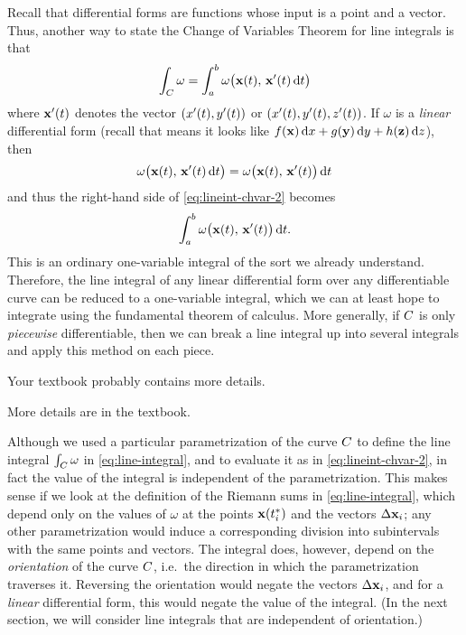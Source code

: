 \documentclass[12pt]{amsart}
\begin{document}
Recall that differential forms are functions whose input is a point and a vector.
Thus, another way to state the Change of Variables Theorem for line integrals is that
\begin{equation}
  \int_{C} \omega = \int_a^b \omega\big(\mathbf{x}(t),\, \mathbf{x}'(t) \,{\mathrm{d} t}\big)\label{eq:lineint-chvar-2}
\end{equation}
where $\mathbf{x}'(t)$ denotes the vector $(x'(t),y'(t))$ or $(x'(t),y'(t),z'(t))$.
If $\omega$ is a \emph{linear} differential form (recall that means it looks like $f(\mathbf{x})\,{\mathrm{d} x} + g(\mathbf{y})\,{\mathrm{d} y} + h(\mathbf{z})\,{\mathrm{d} z}$), then
\[ \omega\big(\mathbf{x}(t),\, \mathbf{x}'(t) \,{\mathrm{d} t}\big) = \omega\big(\mathbf{x}(t),\, \mathbf{x}'(t)\big)\,{\mathrm{d} t} \]
and thus the right-hand side of \cref{eq:lineint-chvar-2} becomes
\[ \int_a^b \omega\big(\mathbf{x}(t),\, \mathbf{x}'(t)\big)\,{\mathrm{d} t}. \]
This is an ordinary one-variable integral of the sort we already understand.
Therefore, the line integral of any linear differential form over any differentiable curve can be reduced to a one-variable integral, which we can at least hope to integrate using the fundamental theorem of calculus.
More generally, if $C$ is only \emph{piecewise} differentiable, then we can break a line integral up into several integrals and apply this method on each piece.
\begin{notextbook}Your textbook probably contains more details.\end{notextbook}
\begin{stewart}More details are in the textbook.\end{stewart}

\begin{rmk}\label{rmk:lineint-orientation}
  Although we used a particular parametrization of the curve $C$ to define the line integral $\int_{C} \omega$ in \cref{eq:line-integral}, and to evaluate it as in \cref{eq:lineint-chvar-2}, in fact the value of the integral is independent of the parametrization.
  This makes sense if we look at the definition of the Riemann sums in \cref{eq:line-integral}, which depend only on the values of $\omega$ at the points $\mathbf{x}({t}_{i}^*)$ and the vectors $\Delta \mathbf{x}_i$; any other parametrization would induce a corresponding division into subintervals with the same points and vectors.
  The integral does, however, depend on the \emph{orientation} of the curve $C$, i.e.\ the direction in which the parametrization traverses it.
  Reversing the orientation would negate the vectors $\Delta \mathbf{x}_i$, and for a \emph{linear} differential form, this would negate the value of the integral.
  (In the next section, we will consider line integrals that are independent of orientation.)
\end{rmk}
\end{document}

